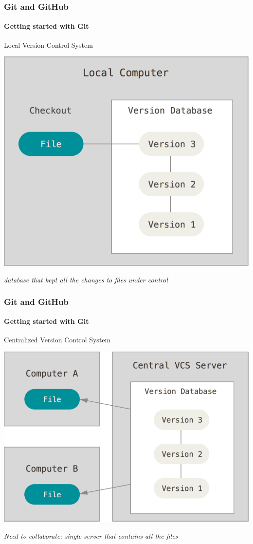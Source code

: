 \begin{frame}
    \frametitle{Git and GitHub}
    \framesubtitle{Getting started with Git}
    \addtocounter{nframe}{1}
    
    \begin{block}{Local Version Control System}
        \begin{center}

            \includegraphics[width=.55\textwidth]{imgs/local.png}
    
        \end{center}
    
    \end{block}

    \textit{database that kept all the changes to files under control}

\end{frame}

\begin{frame}
    \frametitle{Git and GitHub}
    \framesubtitle{Getting started with Git}
    \addtocounter{nframe}{1}
    
    \begin{block}{Centralized Version Control System}
        \begin{center}

            \includegraphics[width=.6\textwidth]{imgs/centralized.png}
    
        \end{center}
    
    \end{block}

    \textit{Need to collaborate: single server that contains all the files}

\end{frame}


